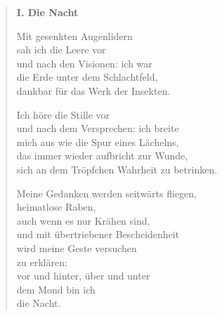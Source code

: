 
\cleartoverso

\label{yucatan}


\begin{verse}

{\bfseries I. Die Nacht}

Mit gesenkten Augenlidern\\
sah ich die Leere vor\\
und nach den Visionen: ich war\\
die Erde unter dem Schlachtfeld,\\
dankbar für das Werk der Insekten.

Ich höre die Stille vor\\
und nach dem Versprechen: ich breite\\
mich aus wie die Spur eines Lächelns,\\
das immer wieder aufbricht zur Wunde,\\
sich an dem Tröpfchen Wahrheit zu betrinken.

Meine Gedanken werden seitwärts fliegen,\\
heimatlose Raben,\\
auch wenn es nur Krähen sind,\\
und mit übertriebener Bescheidenheit\\
wird meine Geste versuchen\\
zu erklären:\\
vor und hinter, über und unter\\
dem Mond bin ich\\
die Nacht.
\end{verse}

\clearpage



